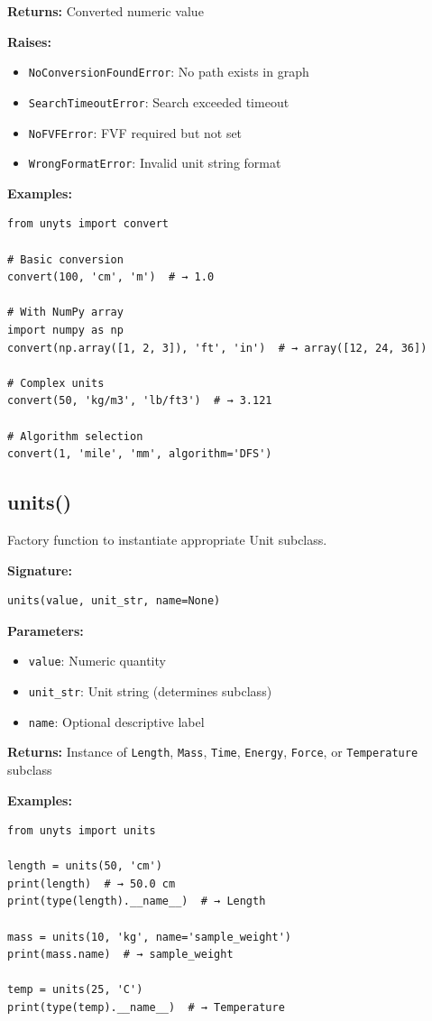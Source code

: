 \documentclass[11pt,a4paper]{report}
\begin{document}
\textbf{Returns:} Converted numeric value

\textbf{Raises:}
\begin{itemize}
\item \texttt{NoConversionFoundError}: No path exists in graph
\item \texttt{SearchTimeoutError}: Search exceeded timeout
\item \texttt{NoFVFError}: FVF required but not set
\item \texttt{WrongFormatError}: Invalid unit string format
\end{itemize}

\textbf{Examples:}
\begin{lstlisting}[style=pythonstyle]
from unyts import convert

# Basic conversion
convert(100, 'cm', 'm')  # → 1.0

# With NumPy array
import numpy as np
convert(np.array([1, 2, 3]), 'ft', 'in')  # → array([12, 24, 36])

# Complex units
convert(50, 'kg/m3', 'lb/ft3')  # → 3.121

# Algorithm selection
convert(1, 'mile', 'mm', algorithm='DFS')
\end{lstlisting}

\subsection{units()}

Factory function to instantiate appropriate Unit subclass.

\textbf{Signature:}
\begin{lstlisting}[style=pythonstyle]
units(value, unit_str, name=None)
\end{lstlisting}

\textbf{Parameters:}
\begin{itemize}
\item \texttt{value}: Numeric quantity
\item \texttt{unit\_str}: Unit string (determines subclass)
\item \texttt{name}: Optional descriptive label
\end{itemize}

\textbf{Returns:} Instance of \texttt{Length}, \texttt{Mass}, \texttt{Time}, \texttt{Energy}, \texttt{Force}, or \texttt{Temperature} subclass

\textbf{Examples:}
\begin{lstlisting}[style=pythonstyle]
from unyts import units

length = units(50, 'cm')
print(length)  # → 50.0 cm
print(type(length).__name__)  # → Length

mass = units(10, 'kg', name='sample_weight')
print(mass.name)  # → sample_weight

temp = units(25, 'C')
print(type(temp).__name__)  # → Temperature
\end{lstlisting}
\end{document}
